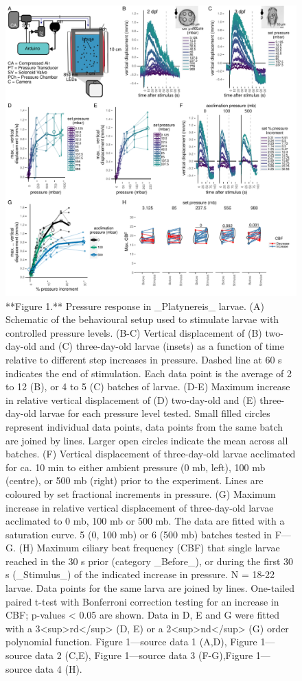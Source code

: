 \documentclass[
]{article}
\begin{document}
\begin{figure}
\includegraphics[width=38.89in]{Figures/Figure1} \caption{**Figure 1.** Pressure response in _Platynereis_ larvae. (A) Schematic of the behavioural setup used to stimulate larvae with controlled pressure levels. (B-C) Vertical displacement of (B) two-day-old and (C) three-day-old larvae (insets) as a function of time relative to different step increases in pressure. Dashed line at 60 s indicates the end of stimulation. Each data point is the average of 2 to 12 (B), or 4 to 5 (C) batches of larvae. (D-E) Maximum increase in relative vertical displacement of (D) two-day-old and (E) three-day-old larvae for each pressure level tested. Small filled circles represent individual data points, data points from the same batch are joined by lines. Larger open circles indicate the mean across all batches. (F) Vertical displacement of three-day-old larvae acclimated for ca. 10 min to either ambient pressure (0 mb, left), 100 mb (centre), or 500 mb (right) prior to the experiment. Lines are coloured by set fractional increments in pressure. (G) Maximum increase in relative vertical displacement of three-day-old larvae acclimated to 0 mb, 100 mb or 500 mb. The data are fitted with a saturation curve. 5 (0, 100 mb) or 6 (500 mb) batches tested in F—G. (H) Maximum ciliary beat frequency (CBF) that single larvae reached in the 30 s prior (category _Before_), or during the first 30 s (_Stimulus_) of the indicated increase in pressure. N = 18-22 larvae. Data points for the same larva are joined by lines. One-tailed paired t-test with Bonferroni correction testing for an increase in CBF; p-values < 0.05 are shown. Data in D, E and G were fitted with a 3<sup>rd</sup> (D, E) or a 2<sup>nd</sup> (G) order polynomial function. Figure 1---source data 1 (A,D), Figure 1---source data 2 (C,E), Figure 1---source data 3 (F-G),Figure 1---source data 4 (H).}\label{fig:unnamed-chunk-2}
\end{figure}
\end{document}
